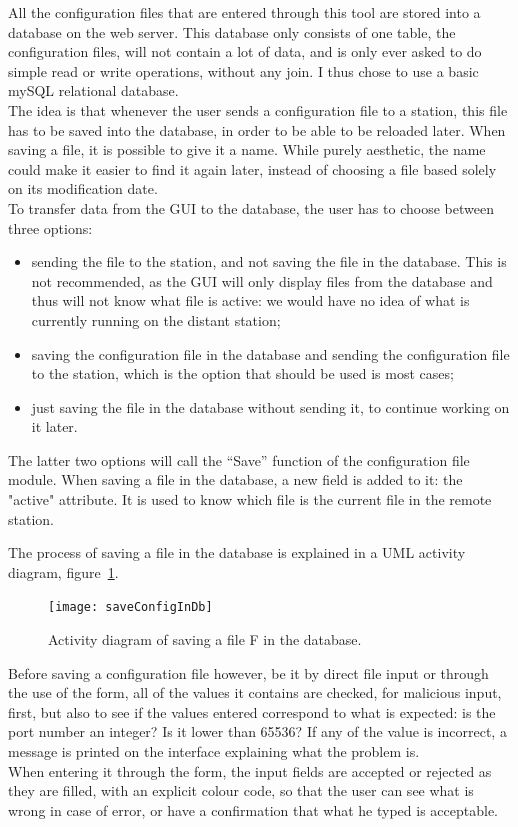 \documentclass{themeensg}
\begin{document}
All the configuration files that are entered through this tool are stored into a database on the web server. This database only consists of one table, the configuration files, will not contain a lot of data, and is only ever asked to do simple read or write operations, without any join. I thus chose to use a basic mySQL relational database.\\

The idea is that whenever the user sends a configuration file to a station, this file has to be saved into the database, in order to be able to be reloaded later. When saving a file, it is possible to give it a name. While purely aesthetic, the name could make it easier to find it again later, instead of choosing a file based solely on its modification date.\\
To transfer data from the GUI to the database, the user has to choose between three options: \begin{itemize}
\item sending the file to the station, and not saving the file in the database. This is not recommended, as the GUI will only display files from the database and thus will not know what file is active: we would have no idea of what is currently running on the distant station;
\item saving the configuration file in the database and sending the configuration file to the station, which is the option that should be used is most cases;
\item just saving the file in the database without sending it, to continue working on it later.
\end{itemize}
The latter two options will call the “Save” function of the configuration file module. When saving a file in the database, a new field is added to it: the "active" attribute. It is used to know which file is the current file in the remote station.

The process of saving a file in the database is explained in a UML activity diagram, figure~\ref{fig:saveConfig}.\\

\begin{figure}[ht]
	\centering
	\texttt{[image: saveConfigInDb]}
	\caption{Activity diagram of saving a file F in the database.}
	\label{fig:saveConfig}
\end{figure}

Before saving a configuration file however, be it by direct file input or through the use of the form, all of the values it contains are checked, for malicious input, first, but also to see if the values entered correspond to what is expected: is the port number an integer? Is it lower than 65536? If any of the value is incorrect, a message is printed on the interface explaining what the problem is.\\
When entering it through the form, the input fields are accepted or rejected as they are filled, with an explicit colour code, so that the user can see what is wrong in case of error, or have a confirmation that what he typed is acceptable. 
\end{document}
